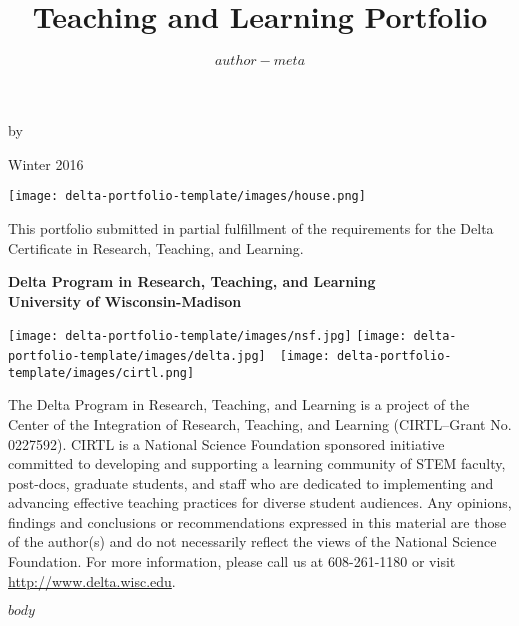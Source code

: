 \documentclass[12pt]{report} %
\title{Teaching and Learning Portfolio}
\author{$author-meta$}
\begin{document}
\begin{titlepage}
\begin{center}
\vspace*{0cm}
{\Large \textbf{\@title} \par}
\vspace{0.6cm}
{\Large by \par}
\vspace{0.6cm}
{\Large \textbf{\@author} \par}
\vspace{0.6cm}
{\Large Winter 2016 \par}
\vspace{1.0cm}
\texttt{[image: delta-portfolio-template/images/house.png]} \par
\vspace{1.0cm}
{This portfolio submitted in partial fulfillment of the requirements for the Delta Certificate in Research, Teaching, and Learning.\par}
\vspace{0.75cm}
{\textbf{ Delta Program in Research, Teaching, and Learning \\ University of Wisconsin-Madison }\par}
\vspace{0.75cm}
\texttt{[image: delta-portfolio-template/images/nsf.jpg]}
\texttt{[image: delta-portfolio-template/images/delta.jpg]}\ \ 
\texttt{[image: delta-portfolio-template/images/cirtl.png]}
\end{center}
{\tiny The Delta Program in Research, Teaching, and Learning is a project of the Center of the Integration of Research, Teaching, and Learning (CIRTL--Grant No. 0227592).  CIRTL is a National Science Foundation sponsored initiative committed to developing and supporting a learning community of STEM faculty, post-docs, graduate students, and staff who are dedicated to implementing  and advancing effective teaching practices for diverse student audiences.  Any opinions, findings and conclusions or recommendations expressed in this material are those of the author(s) and do not necessarily reflect the views of the National Science Foundation. For more information, please call us at 608-261-1180 or visit \url{http://www.delta.wisc.edu}. \par}
\end{titlepage}

\makeatletter
\let\ps@plain\ps@fancy 
\makeatother

\tableofcontents

\newpage
$body$
\end{document}

